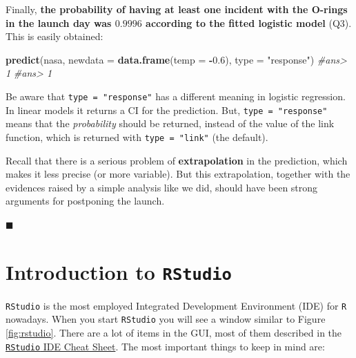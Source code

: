 \documentclass[]{book}
\newenvironment{Shaded}{\begin{snugshade}}{\end{snugshade}}
\newcommand{\KeywordTok}[1]{\textcolor[rgb]{0.13,0.29,0.53}{\textbf{#1}}}
\newcommand{\DataTypeTok}[1]{\textcolor[rgb]{0.13,0.29,0.53}{#1}}
\newcommand{\FloatTok}[1]{\textcolor[rgb]{0.00,0.00,0.81}{#1}}
\newcommand{\StringTok}[1]{\textcolor[rgb]{0.31,0.60,0.02}{#1}}
\newcommand{\CommentTok}[1]{\textcolor[rgb]{0.56,0.35,0.01}{\textit{#1}}}
\newcommand{\OperatorTok}[1]{\textcolor[rgb]{0.81,0.36,0.00}{\textbf{#1}}}
\newcommand{\NormalTok}[1]{#1}
\theoremstyle{definition}
\theoremstyle{definition}
\theoremstyle{definition}
\theoremstyle{remark}
\begin{document}
\begin{Shaded}
\end{Shaded}

Finally, \textbf{the probability of having at least one incident with
the O-rings in the launch day was \(0.9996\) according to the fitted
logistic model} (Q3). This is easily obtained:

\begin{Shaded}
\begin{Highlighting}[]
\KeywordTok{predict}\NormalTok{(nasa, }\DataTypeTok{newdata =} \KeywordTok{data.frame}\NormalTok{(}\DataTypeTok{temp =} \OperatorTok{-}\FloatTok{0.6}\NormalTok{), }\DataTypeTok{type =} \StringTok{"response"}\NormalTok{)}
\CommentTok{#ans> 1 }
\CommentTok{#ans> 1}
\end{Highlighting}
\end{Shaded}

Be aware that \texttt{type\ =\ "response"} has a different meaning in
logistic regression. In linear models it returns a CI for the
prediction. But, \texttt{type\ =\ "response"} means that the
\emph{probability} should be returned, instead of the value of the link
function, which is returned with \texttt{type\ =\ "link"} (the default).

Recall that there is a serious problem of \textbf{extrapolation} in the
prediction, which makes it less precise (or more variable). But this
extrapolation, together with the evidences raised by a simple analysis
like we did, should have been strong arguments for postponing the
launch.

◼

\appendix {}


\chapter{\texorpdfstring{Introduction to
\texttt{RStudio}}{Introduction to RStudio}}\label{app-introRStudio}

\texttt{RStudio} is the most employed Integrated Development Environment
(IDE) for \texttt{R} nowadays. When you start \texttt{RStudio} you will
see a window similar to Figure \ref{fig:rstudio}. There are a lot of
items in the GUI, most of them described in the
\href{https://www.rstudio.com/wp-content/uploads/2016/01/rstudio-IDE-cheatsheet.pdf}{\texttt{RStudio}
IDE Cheat Sheet}. The most important things to keep in mind are:
\end{document}
